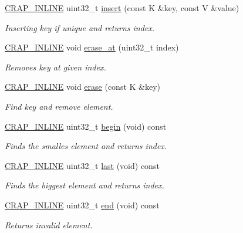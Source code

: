 \begin{DoxyCompactItemize}
\hyperlink{config__x86_8h_a5a40526b8d842e7ff731509998bb0f1c}{C\+R\+A\+P\+\_\+\+I\+N\+L\+I\+N\+E} uint32\+\_\+t \hyperlink{classcrap_1_1tree__map_a413036914eb0b67e78f13ea57d8c586e}{insert} (const K \&key, const V \&value)
\begin{DoxyCompactList}\small\item\em Inserting key if unique and returns index. \end{DoxyCompactList}\item 
\hyperlink{config__x86_8h_a5a40526b8d842e7ff731509998bb0f1c}{C\+R\+A\+P\+\_\+\+I\+N\+L\+I\+N\+E} void \hyperlink{classcrap_1_1tree__map_add39f3a7ad51cc8bdf41b89dbd93e7e9}{erase\+\_\+at} (uint32\+\_\+t index)
\begin{DoxyCompactList}\small\item\em Removes key at given index. \end{DoxyCompactList}\item 
\hyperlink{config__x86_8h_a5a40526b8d842e7ff731509998bb0f1c}{C\+R\+A\+P\+\_\+\+I\+N\+L\+I\+N\+E} void \hyperlink{classcrap_1_1tree__map_a4e7f6c5e909954c0ce8fb747eb67e560}{erase} (const K \&key)
\begin{DoxyCompactList}\small\item\em Find key and remove element. \end{DoxyCompactList}\item 
\hyperlink{config__x86_8h_a5a40526b8d842e7ff731509998bb0f1c}{C\+R\+A\+P\+\_\+\+I\+N\+L\+I\+N\+E} uint32\+\_\+t \hyperlink{classcrap_1_1tree__map_a9c58b3571994b80be731851994a76efe}{begin} (void) const 
\begin{DoxyCompactList}\small\item\em Finds the smalles element and returns index. \end{DoxyCompactList}\item 
\hyperlink{config__x86_8h_a5a40526b8d842e7ff731509998bb0f1c}{C\+R\+A\+P\+\_\+\+I\+N\+L\+I\+N\+E} uint32\+\_\+t \hyperlink{classcrap_1_1tree__map_a85216dea6bbcc284a0c32dc4dafbceba}{last} (void) const 
\begin{DoxyCompactList}\small\item\em Finds the biggest element and returns index. \end{DoxyCompactList}\item 
\hyperlink{config__x86_8h_a5a40526b8d842e7ff731509998bb0f1c}{C\+R\+A\+P\+\_\+\+I\+N\+L\+I\+N\+E} uint32\+\_\+t \hyperlink{classcrap_1_1tree__map_a833fd2d7bf97560a8c1caa956eed8cdf}{end} (void) const 
\begin{DoxyCompactList}\small\item\em Returns invalid element. \end{DoxyCompactList}\item 

\end{DoxyCompactItemize}

